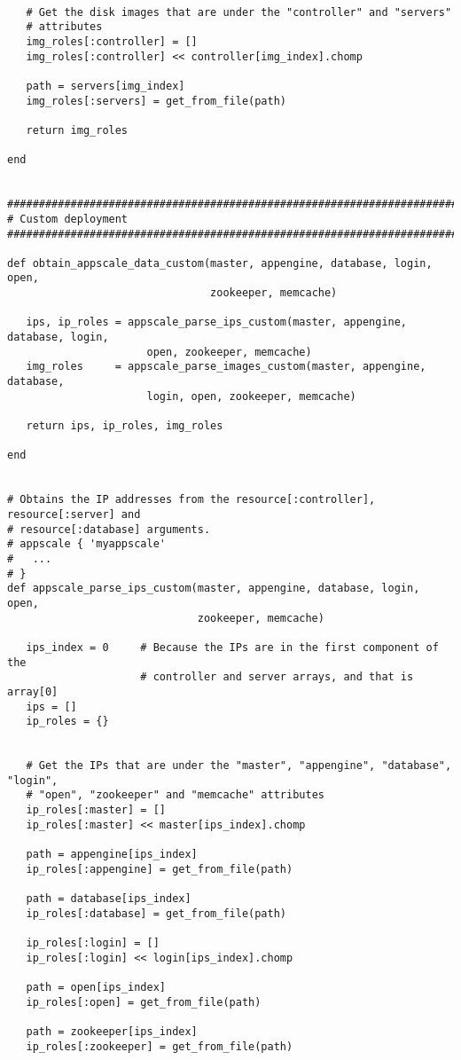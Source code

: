 \begin{lstlisting}
   
   # Get the disk images that are under the "controller" and "servers"
   # attributes
   img_roles[:controller] = []
   img_roles[:controller] << controller[img_index].chomp
   
   path = servers[img_index]
   img_roles[:servers] = get_from_file(path)
   
   return img_roles
   
end


################################################################################
# Custom deployment
################################################################################

def obtain_appscale_data_custom(master, appengine, database, login, open,
                                zookeeper, memcache)

   ips, ip_roles = appscale_parse_ips_custom(master, appengine, database, login,
                      open, zookeeper, memcache)
   img_roles     = appscale_parse_images_custom(master, appengine, database,
                      login, open, zookeeper, memcache)
   
   return ips, ip_roles, img_roles

end


# Obtains the IP addresses from the resource[:controller], resource[:server] and
# resource[:database] arguments.
# appscale { 'myappscale'
#   ...
# }
def appscale_parse_ips_custom(master, appengine, database, login, open,
                              zookeeper, memcache)

   ips_index = 0     # Because the IPs are in the first component of the
                     # controller and server arrays, and that is array[0]
   ips = []
   ip_roles = {}

   
   # Get the IPs that are under the "master", "appengine", "database", "login",
   # "open", "zookeeper" and "memcache" attributes
   ip_roles[:master] = []
   ip_roles[:master] << master[ips_index].chomp
   
   path = appengine[ips_index]
   ip_roles[:appengine] = get_from_file(path)
   
   path = database[ips_index]
   ip_roles[:database] = get_from_file(path)
   
   ip_roles[:login] = []
   ip_roles[:login] << login[ips_index].chomp
   
   path = open[ips_index]
   ip_roles[:open] = get_from_file(path)
      
   path = zookeeper[ips_index]
   ip_roles[:zookeeper] = get_from_file(path)


\end{lstlisting}
